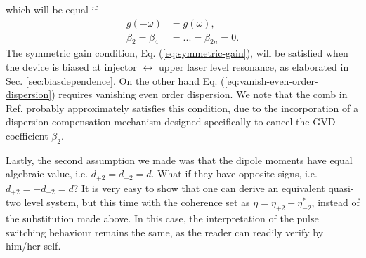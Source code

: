\documentclass[]{spie}  %
\begin{document}
which will be equal if
\begin{subequations}
	\begin{align}
	g(-\omega) &= g(\omega), \label{eq:symmetric-gain}\\
	\beta_2 = \beta_4 &= ... = \beta_{2n}=0. \label{eq:vanish-even-order-dispersion}
	\end{align}
\end{subequations}
The symmetric gain condition, Eq. (\ref{eq:symmetric-gain}), will be satisfied when the device is biased at injector $\leftrightarrow$ upper laser level resonance, as elaborated in Sec. \ref{sec:biasdependence}. On the other hand Eq. (\ref{eq:vanish-even-order-dispersion}) requires vanishing even order dispersion. We note that the comb in Ref. \cite{burghoff2014terahertz} probably approximately satisfies this condition, due to the incorporation of a dispersion compensation mechanism designed specifically to cancel the GVD coefficient $\beta_2$.

Lastly, the second assumption we made was that the dipole moments have equal algebraic value, i.e. $d_{+2} = d_{-2} = d$. What if they have opposite signs, i.e. $d_{+2} = -d_{-2} = d$? It is very easy to show that one can derive an equivalent quasi-two level system, but this time with the coherence set as $\eta = \eta_{+2}-\eta_{-2}^*$, instead of the substitution made above. In this case, the interpretation of the pulse switching behaviour remains the same, as the reader can readily verify by him/her-self.
\acknowledgments %



\end{document}
